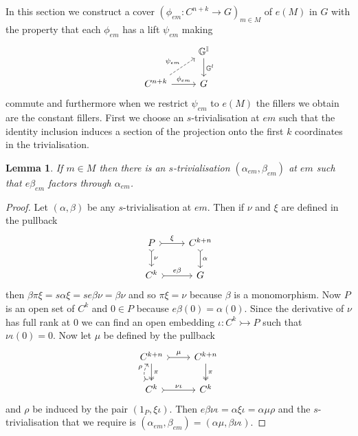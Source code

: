 \documentclass[10pt,a4paper]{amsart}
\numberwithin{equation}{section}
\newtheorem{Lemma}[Theorem]{Lemma}
\begin{document}
In this section we construct a cover $(\phi_{em}\colon C^{n+k} \rightarrow G)_{m\in M}$ of $e(M)$ in $G$ with the property that each $\phi_{em}$ has a lift $\psi_{em}$ making
\begin{equation*}
 \begin{tikzcd}
 {} & \mathbb{G}^{\mathbb{I}} \dar{\mathbb{G}^{l}}\\
 C^{n+k} \urar[dashed]{\psi_{em}} \rar{\phi_{em}} & G
 \end{tikzcd}
\end{equation*}
commute and furthermore when we restrict $\psi_{em}$ to $e(M)$ the f\/illers we obtain are the constant f\/illers.
First we choose an $s$-trivialisation at $em$ such that the identity inclusion induces a section of the projection onto the f\/irst $k$ coordinates in the trivialisation.

\begin{Lemma}\label{lemma:trivialisation-with-identities-included}
If $m\in M$ then there is an $s$-trivialisation $(\alpha_{em},\beta_{em})$ at $em$ such that $e \beta_{em}$ factors through $\alpha_{em}$.
\end{Lemma}
\begin{proof}Let $(\alpha,\beta)$ be any $s$-trivialisation at $em$. Then if $\nu$ and $\xi$ are def\/ined in the pullback
\begin{equation*}\begin{tikzcd}
P \dar[rightarrowtail]{\nu} \rar[rightarrowtail]{\xi} & C^{k+n}\dar[rightarrowtail]{\alpha} \\
C^{k} \rar[rightarrowtail]{e\beta} & G
\end{tikzcd}\end{equation*}
then $\beta\pi\xi=s\alpha\xi=se\beta\nu=\beta\nu$ and so $\pi\xi=\nu$ because $\beta$ is a monomorphism. Now $P$ is an open set of $C^{k}$ and $0\in P$ because $e\beta(0)=\alpha(0)$. Since the derivative of $\nu$ has full rank at $0$ we can f\/ind an open embedding $\iota\colon C^{k}\rightarrowtail P$ such that $\nu\iota(0)=0$. Now let $\mu$ be def\/ined by the pullback
\begin{equation*}\begin{tikzcd}
C^{k+n} \dar[twoheadrightarrow]{\pi} \rar[rightarrowtail]{\mu} & C^{k+n}\dar[twoheadrightarrow]{\pi} \\
C^{k}\rar[rightarrowtail]{\nu\iota} \uar[bend left,dashed,rightarrowtail]{\rho} & C^{k}
\end{tikzcd}\end{equation*}
and $\rho$ be induced by the pair $(1_{P},\xi\iota)$. Then $e\beta\nu\iota=\alpha\xi\iota=\alpha\mu\rho$ and the $s$-trivialisation that we require is $(\alpha_{em},\beta_{em})=(\alpha\mu,\beta\nu\iota)$.
\end{proof}
\end{document}
